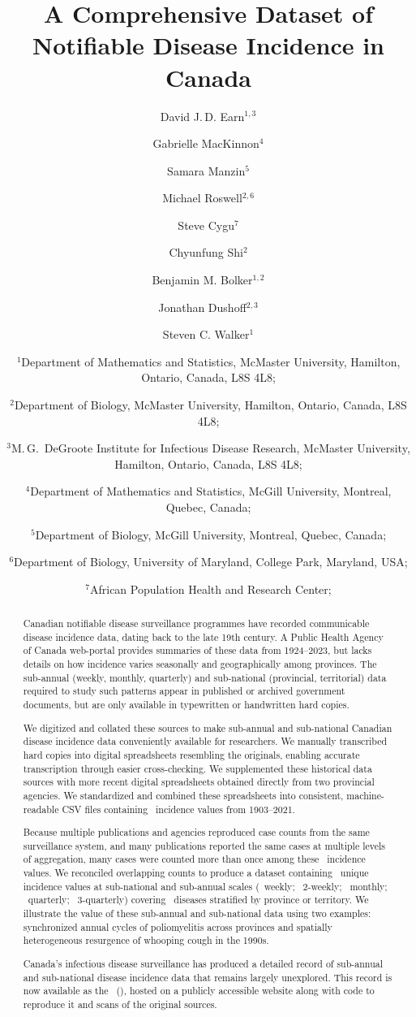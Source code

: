 \documentclass[12pt]{article}
\title{A Comprehensive Dataset of Notifiable Disease Incidence in Canada}
\author{
     David J.\,D. Earn$^{1,3}$
\and Gabrielle MacKinnon$^4$
\and Samara Manzin$^5$
\and Michael Roswell$^{2,6}$ %
\and Steve Cygu$^7$ %
\and Chyunfung Shi$^2$ %
\and Benjamin M. Bolker$^{1,2}$ %
\and Jonathan Dushoff$^{2,3}$ %
\and Steven C. Walker$^1$
\and \footnotesize$^1$Department of Mathematics and Statistics,
     McMaster University, Hamilton, Ontario, Canada, L8S 4L8;
\and \footnotesize$^2$Department of Biology,
     McMaster University, Hamilton, Ontario, Canada, L8S 4L8;
\and \footnotesize$^3$M.\,G.\ DeGroote Institute for Infectious Disease Research,
  McMaster University, Hamilton, Ontario, Canada, L8S 4L8;
\and \footnotesize$^4$Department of Mathematics and Statistics,
  McGill University, Montreal, Quebec, Canada;
\and \footnotesize$^5$Department of Biology,
  McGill University, Montreal, Quebec, Canada;
\and \footnotesize$^6$Department of Biology,
  University of Maryland, College Park, Maryland, USA;
\and \footnotesize$^7$African Population Health and Research Center;
  \\
}
\begin{document}
\maketitle


\newpage

\begin{abstract}

Canadian notifiable disease surveillance programmes have recorded communicable disease incidence data, dating back to the late 19th century. A Public Health Agency of Canada web-portal provides summaries of these data from 1924--2023, but lacks details on how incidence varies seasonally and geographically among provinces. The sub-annual (weekly, monthly, quarterly) and sub-national (provincial, territorial) data required to study such patterns appear in published or archived government documents, but are only available in typewritten or handwritten hard copies.

We digitized and collated these sources to make sub-annual and sub-national Canadian disease incidence data conveniently available for researchers. We manually transcribed hard copies into digital spreadsheets resembling the originals, enabling accurate transcription through easier cross-checking. We supplemented these historical data sources with more recent digital spreadsheets obtained directly from two provincial agencies. We standardized and combined these spreadsheets into consistent, machine-readable CSV files containing \ incidence values from 1903--2021.

Because multiple publications and agencies reproduced case counts from the same surveillance system, and many publications reported the same cases at multiple levels of aggregation, many cases were counted more than once among these \ incidence values. We reconciled overlapping counts to produce a dataset containing \ unique incidence values at sub-national and sub-annual scales (\ weekly; \ 2-weekly; \ monthly; \ quarterly; \ 3-quarterly) covering \ diseases stratified by province or territory. We illustrate the value of these sub-annual and sub-national data using two examples: synchronized annual cycles of poliomyelitis across provinces and spatially heterogeneous resurgence of whooping cough in the 1990s.

Canada's infectious disease surveillance has produced a detailed record of sub-annual and sub-national disease incidence data that remains largely unexplored. This record is now available as the \datname\ (\datacronym), hosted on a publicly accessible website along with code to reproduce it and scans of the original sources.

\end{abstract}
\end{document}
